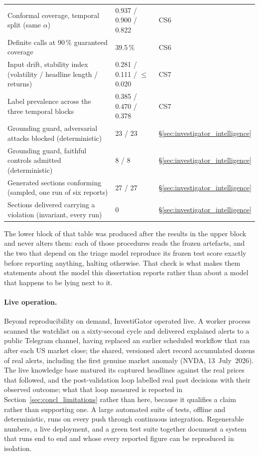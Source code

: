 \begin{table}[ht]
\begin{tabular}{p{7.0cm} l l}
Conformal coverage, temporal split (same $\alpha$) & 0.937 / 0.900 / 0.822 & CS6 \\
Definite calls at 90\,\% guaranteed coverage & 39.5\,\% & CS6 \\
Input drift, stability index (volatility / headline length / returns) & 0.281 / 0.111 / $\le$0.020 & CS7 \\
Label prevalence across the three temporal blocks & 0.385 / 0.470 / 0.378 & CS7 \\
\midrule
Grounding guard, adversarial attacks blocked (deterministic) & 23 / 23 & §\ref{sec:investigator_intelligence} \\
Grounding guard, faithful controls admitted (deterministic) & 8 / 8 & §\ref{sec:investigator_intelligence} \\
Generated sections conforming (sampled, one run of six reports) & 27 / 27 & §\ref{sec:investigator_intelligence} \\
Sections delivered carrying a violation (invariant, every run) & 0 & §\ref{sec:investigator_intelligence} \\
\bottomrule
\end{tabular}
\end{table}

The lower block of that table was produced after the results in the upper block and never alters
them: each of those procedures reads the frozen artefacts, and the two that depend on the triage
model reproduce its frozen test score exactly before reporting anything, halting otherwise. That
check is what makes them statements about the model this dissertation reports rather than about a
model that happens to be lying next to it.

\paragraph{Live operation.} Beyond reproducibility on demand, InvestiGator operated live. A worker
process scanned the watchlist on a sixty-second cycle and delivered explained alerts to a public
Telegram channel, having replaced an earlier scheduled workflow that ran after each US market close;
the shared, versioned alert record accumulated dozens of real alerts, including the first genuine
market anomaly (NVDA, 13~July~2026). The live knowledge base matured its captured
headlines against the real prices that followed, and the post-validation loop labelled real past
decisions with their observed outcome; what that loop measured is reported in
Section~\ref{sec:concl_limitations} rather than here, because it qualifies a claim rather than
supporting one. A large automated suite of tests,
offline and deterministic, runs on every push through continuous integration. Regenerable numbers, a
live deployment, and a green test suite
together document a system that runs end to end and whose every reported figure can be reproduced in
isolation.

